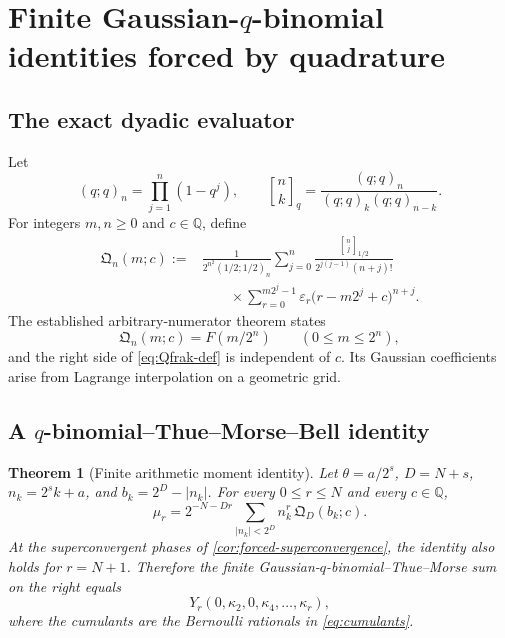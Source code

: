\documentclass[11pt]{article}
\numberwithin{equation}{section}
\newtheorem{theorem}{Theorem}[section]
\theoremstyle{definition}
\theoremstyle{remark}
\newcommand{\Q}{\mathbb Q}
\newcommand{\eps}{\varepsilon}
\newcommand{\abs}[1]{\left|#1\right|}
\newcommand{\qbinom}[3]{\genfrac{[}{]}{0pt}{}{#1}{#2}_{#3}}
\begin{document}
\section{Finite Gaussian-$q$-binomial identities forced by quadrature}
\label{sec:qbinomial}

\subsection{The exact dyadic evaluator}

Let
\begin{equation}
 (q;q)_n=\prod_{j=1}^{n}(1-q^j),
 \qquad
 \qbinom{n}{k}{q}=\frac{(q;q)_n}{(q;q)_k(q;q)_{n-k}}.
 \label{eq:q-notation-report}
\end{equation}
For integers $m,n\ge0$ and $c\in\Q$, define
\begin{equation}
\begin{aligned}
 \mathfrak Q_n(m;c)
 :={}&\frac{1}{2^{n^2}(1/2;1/2)_n}
 \sum_{j=0}^{n}
 \frac{\qbinom{n}{j}{1/2}}
      {2^{j(j-1)}(n+j)!}\\
 &\qquad\times
 \sum_{r=0}^{m2^j-1}\eps_r
 \bigl(r-m2^j+c\bigr)^{n+j}.
 \label{eq:Qfrak-def}
\end{aligned}
\end{equation}
The established arbitrary-numerator theorem states
\begin{equation}
 \mathfrak Q_n(m;c)=F(m/2^n)
 \qquad(0\le m\le2^n),
 \label{eq:Qfrak-F}
\end{equation}
and the right side of \eqref{eq:Qfrak-def} is independent of $c$.  Its Gaussian coefficients arise from Lagrange interpolation on a geometric grid.

\subsection{A $q$-binomial--Thue--Morse--Bell identity}

\begin{theorem}[Finite arithmetic moment identity]
\label{thm:qbinomial-moment-identity}
Let $\theta=a/2^s$, $D=N+s$, $n_k=2^sk+a$, and $b_k=2^D-\abs{n_k}$.  For every $0\le r\le N$ and every $c\in\Q$,
\begin{equation}
 \boxed{\displaystyle
 \mu_r
 =2^{-N-Dr}
 \sum_{\abs{n_k}<2^D}
 n_k^r\,\mathfrak Q_D(b_k;c).}
 \label{eq:qbinomial-moment-identity}
\end{equation}
At the superconvergent phases of \cref{cor:forced-superconvergence}, the identity also holds for $r=N+1$.  Therefore the finite Gaussian-$q$-binomial--Thue--Morse sum on the right equals
\begin{equation}
 Y_r(0,\kappa_2,0,\kappa_4,\ldots,\kappa_r),
 \label{eq:qbinomial-Bell-right}
\end{equation}
where the cumulants are the Bernoulli rationals in \eqref{eq:cumulants}.
\end{theorem}
\end{document}
